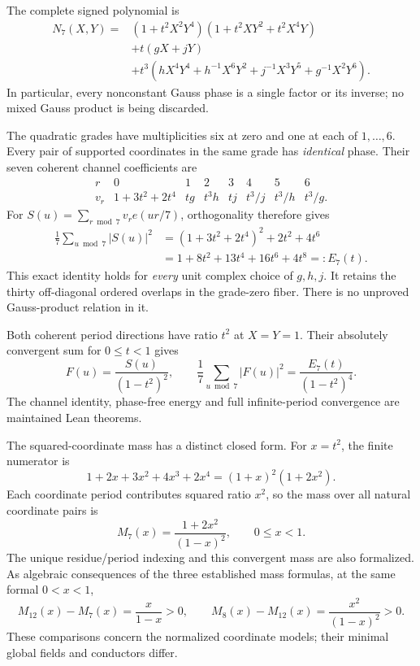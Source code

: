 \documentclass[11pt]{article}
\begin{document}
The complete signed polynomial is
\[
\begin{split}
N_7(X,Y)={}&
 (1+t^2X^2Y^4)(1+t^2XY^2+t^2X^4Y)\\
 &+t(gX+jY)\\
 &+t^3(hX^4Y^4+h^{-1}X^6Y^2
             +j^{-1}X^3Y^5+g^{-1}X^2Y^6).
\end{split}
\]
In particular, every nonconstant Gauss phase is a single factor or
its inverse; no mixed Gauss product is being discarded.

The quadratic grades have multiplicities six at zero and one at
each of $1,\ldots,6$. Every pair of supported coordinates in the
same grade has \emph{identical} phase.
Their seven coherent channel coefficients are
\[
\begin{array}{c|ccccccc}
r&0&1&2&3&4&5&6\\ \hline
v_r&1+3t^2+2t^4&tg&t^3h&tj&t^3/j&t^3/h&t^3/g .
\end{array}
\]
For $S(u)=\sum_{r\bmod7}v_r e(ur/7)$, orthogonality therefore gives
\[
\begin{split}
 \frac17\sum_{u\bmod7}|S(u)|^2
 &=(1+3t^2+2t^4)^2+2t^2+4t^6\\
 &=1+8t^2+13t^4+16t^6+4t^8=:E_7(t).
\end{split}
\]
This exact identity holds for \emph{every} unit complex choice of
$g,h,j$. It retains the thirty off-diagonal ordered overlaps in the
grade-zero fiber. There is no unproved Gauss-product relation in it.

Both coherent period directions have ratio $t^2$ at $X=Y=1$.
Their absolutely convergent sum for $0\le t<1$ gives
\[
 F(u)=\frac{S(u)}{(1-t^2)^2},\qquad
 \frac17\sum_{u\bmod7}|F(u)|^2=\frac{E_7(t)}{(1-t^2)^4}.
\]
The channel identity, phase-free energy and full infinite-period
convergence are maintained Lean theorems.

The squared-coordinate mass has a distinct closed form. For $x=t^2$,
the finite numerator is
\[
 1+2x+3x^2+4x^3+2x^4=(1+x)^2(1+2x^2).
\]
Each coordinate period contributes squared ratio $x^2$, so the mass
over all natural coordinate pairs is
\[
 M_7(x)=\frac{1+2x^2}{(1-x)^2},\qquad0\le x<1.
\]
The unique residue/period indexing and this convergent mass are also
formalized. As algebraic consequences of the three established mass
formulas, at the same formal $0<x<1$,
\[
 M_{12}(x)-M_7(x)=\frac{x}{1-x}>0,\qquad
 M_{8}(x)-M_{12}(x)=\frac{x^2}{(1-x)^2}>0.
\]
These comparisons concern the normalized coordinate models; their
minimal global fields and conductors differ.
\end{document}
